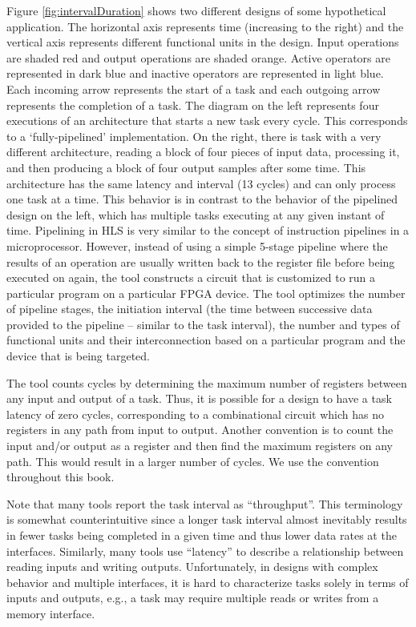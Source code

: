 Figure \ref{fig:intervalDuration} shows two different designs of some hypothetical application.   The horizontal axis represents time (increasing to the right) and the vertical axis represents different functional units in the design.  Input operations are shaded red and output operations are shaded orange.  Active operators are represented in dark blue and inactive operators are represented in light blue.  Each incoming arrow represents the start of a task and each outgoing arrow represents the completion of a task.  The diagram on the left represents four executions of an architecture that starts a new task every cycle. This corresponds to a `fully-pipelined' implementation. On the right, there is task with a very different architecture, reading a block of four pieces of input data, processing it, and then producing a block of four output samples after some time.  This architecture has the same latency and interval (13 cycles) and can only process one task at a time.  This behavior is in contrast to the behavior of the pipelined design on the left, which has multiple tasks executing at any given instant of time.  Pipelining in HLS is very similar to the concept of instruction pipelines in a microprocessor.  However, instead of using a simple 5-stage pipeline where the results of an operation are usually written back to the register file before being executed on again, the \VHLS tool constructs a circuit that is customized to run a particular program on a particular FPGA device.  The tool optimizes the number of pipeline stages, the initiation interval (the time between successive data provided to the pipeline -- similar to the task interval), the number and types of functional units and their interconnection based on a particular program and the device that is being targeted.

The \VHLS tool counts cycles by determining the maximum number of registers between any input and output of a task. Thus, it is possible for a design to have a task latency of zero cycles, corresponding to a combinational circuit which has no registers in any path from input to output. Another convention is to count the input and/or output as a register and then find the maximum registers on any path. This would result in a larger number of cycles. We use the \VHLS convention throughout this book.

\begin{aside}
Note that many tools report the task interval as ``throughput''. This terminology is somewhat counterintuitive since a longer task interval almost inevitably results in fewer tasks being completed in a given time and thus lower data rates at the interfaces.  Similarly, many tools use ``latency'' to describe a relationship between reading inputs and writing outputs.  Unfortunately, in designs with complex behavior and multiple interfaces, it is hard to characterize tasks solely in terms of inputs and outputs, e.g., a task may require multiple reads or writes from a memory interface. 
\end{aside}



